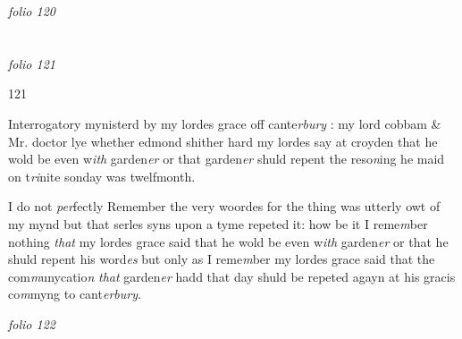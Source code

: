 \documentclass[12pt, a4paper]{book}
\begin{document}

\textit{folio 120}


         \vspace{4cm}
         
\dotfill
					  \section*{}  \subsection*{}

\textit{folio 121}



\begin{flushright}{\color{Mahogany}121}\end{flushright}
            		
		\ifthenelse{\isodd{\thepage}}
		{\reversemarginpar}
		{\normalmarginpar}
		Interrogatory mynisterd by my lordes grace off
            			cante\textit{rbury} : my lord cobbam \& Mr. doctor lye whether
            			edmond shither hard my lordes say at croyden that
            			he wold be even w\textit{ith} garden\textit{er} or that garden\textit{er} shuld
 repent the reso\textit{n}ing he maid on t\textit{ri}nite sonday was
 twelfmonth.

		\ifthenelse{\isodd{\thepage}}
		{\reversemarginpar}
		{\normalmarginpar}
		I do not \textit{per}fectly Remember the very woordes for the thing was
 utterly owt of my mynd but that serles syns upon a tyme
	repeted it: how be it I reme\textit{m}ber nothing \textit{that} my lordes grace said
	that he wold be even w\textit{ith} garden\textit{er} or that he shuld repent his word\textit{es}
	but only as I reme\textit{m}ber my lordes grace said that the com\textit{m}unycatio\textit{n}
	\textit{that} garden\textit{er} hadd that day shuld be repeted agayn at his gracis
	co\textit{m}myng to cant\textit{erbury}.

\dotfill
					

\textit{folio 122}


         \vspace{4cm}
         
\dotfill
					  \section*{}  \subsection*{}
\end{document}
